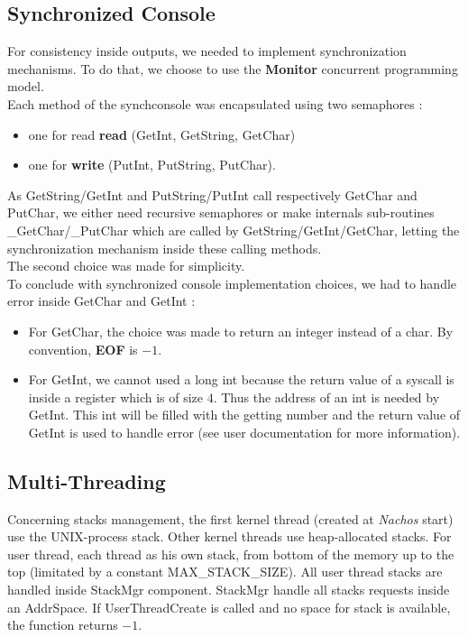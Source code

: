\subsection{Synchronized Console}

For consistency inside outputs, we needed to implement synchronization
mechanisms. To do that, we choose to use the \textbf{Monitor} concurrent
programming model.\\
Each method of the synchconsole was encapsulated using two
semaphores :
\begin{itemize}
    \item one for read \textbf{read} (GetInt, GetString, GetChar)
    \item one for \textbf{write} (PutInt, PutString, PutChar).
\end{itemize}

As GetString/GetInt and PutString/PutInt call respectively GetChar and PutChar,
we either need recursive semaphores or make internals sub-routines
\_GetChar/\_PutChar which are called by GetString/GetInt/GetChar, letting the
synchronization mechanism inside these calling methods.\\
The second choice was made for simplicity.\\

To conclude with synchronized console implementation choices, we had to handle
error inside GetChar and GetInt :
\begin{itemize}
    \item For GetChar, the choice was made to return an integer instead of a char. By
convention, \textbf{EOF} is $-1$.
    \item For GetInt, we cannot used a long int because the return value of a syscall is
inside a register which is of size $4$. Thus the address of an int is needed by
GetInt. This int will be filled with the getting number and the return value of
GetInt is used to handle error (see user documentation for more information).
\end{itemize}

\subsection{Multi-Threading}

Concerning stacks management, the first kernel thread (created at \emph{Nachos}
start) use the UNIX-process stack. Other kernel threads use heap-allocated
stacks. For user thread, each thread as his own stack, from bottom of the memory
up to the top (limitated by a constant MAX\_STACK\_SIZE). All user thread stacks
are handled inside StackMgr component.  StackMgr handle all stacks requests inside
an AddrSpace. If UserThreadCreate is
called and no space for stack is available, the function returns $-1$.\\


